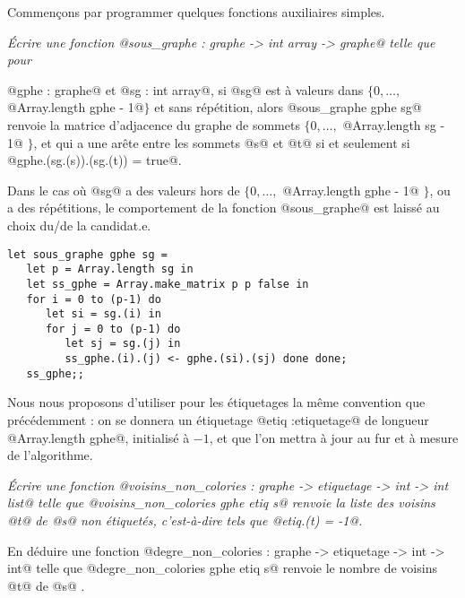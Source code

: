 Commençons par programmer quelques fonctions auxiliaires simples. 
\begin{Exercise}\it Écrire une fonction @sous_graphe : graphe -> int array -> graphe@ telle que pour 

@gphe : graphe@ et @sg : int array@, si @sg@ est à valeurs dans $\{0, \dots, $ @Array.length gphe - 1@$\}$ et sans répétition, alors @sous_graphe gphe sg@ renvoie la matrice d'adjacence du graphe de sommets $\{0, \dots, $ @Array.length sg - 1@ $\}$, et qui a une arête entre les sommets @s@ et @t@ si et seulement si \\ @gphe.(sg.(s)).(sg.(t)) = true@.

Dans le cas où @sg@ a des valeurs hors de $\{0, \dots, $ @Array.length gphe - 1@ $\}$, ou a des répétitions, le comportement de la fonction @sous_graphe@ est laissé au choix du/de la candidat.e. 
\end{Exercise}  
\begin{Answer}
\begin{lstlisting}
let sous_graphe gphe sg =
   let p = Array.length sg in
   let ss_gphe = Array.make_matrix p p false in
   for i = 0 to (p-1) do
      let si = sg.(i) in
      for j = 0 to (p-1) do
         let sj = sg.(j) in
         ss_gphe.(i).(j) <- gphe.(si).(sj) done done;
   ss_gphe;;
\end{lstlisting}
\end{Answer}
Nous nous proposons d'utiliser pour les étiquetages la même convention que précédemment : on se donnera un étiquetage @etiq :etiquetage@ de longueur @Array.length gphe@, initialisé à $-1$, et que l'on mettra à jour au fur et à mesure de l'algorithme. 
\begin{Exercise}\it Écrire une fonction @voisins_non_colories : graphe -> etiquetage -> int -> int list@ telle que @voisins_non_colories gphe etiq s@ renvoie la liste des voisins @t@ de @s@ non étiquetés,
c'est-à-dire tels que @etiq.(t) = -1@. 

En déduire une fonction @degre_non_colories : graphe -> etiquetage -> int -> int@ telle que @degre_non_colories gphe etiq s@ renvoie le nombre de voisins @t@ de @s@ . 
\end{Exercise}  

